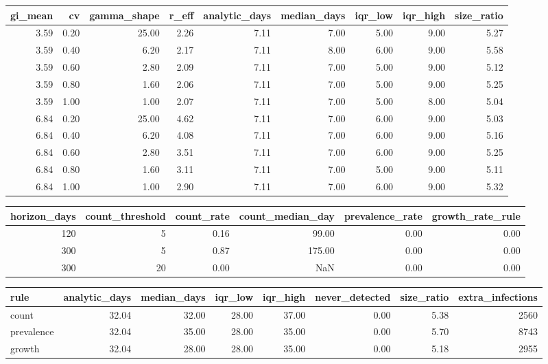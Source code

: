 \begin{tabular}{rrrrrrrrr}
\toprule
gi\_mean & cv & gamma\_shape & r\_eff & analytic\_days & median\_days & iqr\_low & iqr\_high & size\_ratio \\
\midrule
3.59 & 0.20 & 25.00 & 2.26 & 7.11 & 7.00 & 5.00 & 9.00 & 5.27 \\
3.59 & 0.40 & 6.20 & 2.17 & 7.11 & 8.00 & 6.00 & 9.00 & 5.58 \\
3.59 & 0.60 & 2.80 & 2.09 & 7.11 & 7.00 & 5.00 & 9.00 & 5.12 \\
3.59 & 0.80 & 1.60 & 2.06 & 7.11 & 7.00 & 5.00 & 9.00 & 5.25 \\
3.59 & 1.00 & 1.00 & 2.07 & 7.11 & 7.00 & 5.00 & 8.00 & 5.04 \\
6.84 & 0.20 & 25.00 & 4.62 & 7.11 & 7.00 & 6.00 & 9.00 & 5.03 \\
6.84 & 0.40 & 6.20 & 4.08 & 7.11 & 7.00 & 6.00 & 9.00 & 5.16 \\
6.84 & 0.60 & 2.80 & 3.51 & 7.11 & 7.00 & 6.00 & 9.00 & 5.25 \\
6.84 & 0.80 & 1.60 & 3.11 & 7.11 & 7.00 & 5.00 & 9.00 & 5.11 \\
6.84 & 1.00 & 1.00 & 2.90 & 7.11 & 7.00 & 6.00 & 9.00 & 5.32 \\
\bottomrule
\end{tabular}


\begin{tabular}{rrrrrr}
\toprule
horizon\_days & count\_threshold & count\_rate & count\_median\_day & prevalence\_rate & growth\_rate\_rule \\
\midrule
120 & 5 & 0.16 & 99.00 & 0.00 & 0.00 \\
300 & 5 & 0.87 & 175.00 & 0.00 & 0.00 \\
300 & 20 & 0.00 & NaN & 0.00 & 0.00 \\
\bottomrule
\end{tabular}


\begin{tabular}{lrrrrrrr}
\toprule
rule & analytic\_days & median\_days & iqr\_low & iqr\_high & never\_detected & size\_ratio & extra\_infections \\
\midrule
count & 32.04 & 32.00 & 28.00 & 37.00 & 0.00 & 5.38 & 2560 \\
prevalence & 32.04 & 35.00 & 28.00 & 35.00 & 0.00 & 5.70 & 8743 \\
growth & 32.04 & 28.00 & 28.00 & 35.00 & 0.00 & 5.18 & 2955 \\
\bottomrule
\end{tabular}


